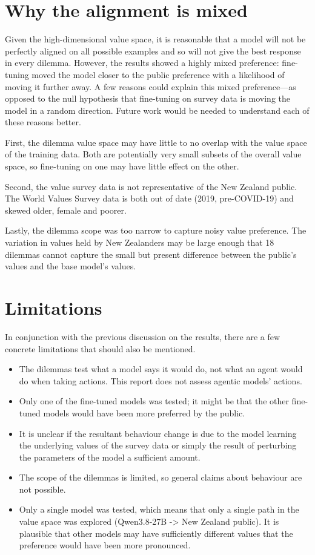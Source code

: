 \section{Why the alignment is mixed}

Given the high-dimensional value space, it is reasonable that a model will not be perfectly aligned on all possible examples and so will not give the best response in every dilemma. However, the results showed a highly mixed preference: fine-tuning moved the model closer to the public preference with a  likelihood of moving it further away. A few reasons could explain this mixed preference—as opposed to the null hypothesis that fine-tuning on survey data is moving the model in a random direction. Future work would be needed to understand each of these reasons better.

First, the dilemma value space may have little to no overlap with the value space of the training data. Both are potentially very small subsets of the overall value space, so fine-tuning on one may have little effect on the other.

Second, the value survey data is not representative of the New Zealand public. The World Values Survey data is both out of date (2019, pre-COVID-19) and skewed older, female and poorer.

Lastly, the dilemma scope was too narrow to capture noisy value preference. The variation in values held by New Zealanders may be large enough that 18 dilemmas cannot capture the small but present difference between the public's values and the base model's values.

\section{Limitations}

In conjunction with the previous discussion on the results, there are a few concrete limitations that should also be mentioned.

\begin{itemize}
    \item The dilemmas test what a model says it would do, not what an agent would do when taking actions. This report does not assess agentic models' actions.
    \item Only one of the fine-tuned models was tested; it might be that the other fine-tuned models would have been more preferred by the public.
    \item It is unclear if the resultant behaviour change is due to the model learning the underlying values of the survey data or simply the result of perturbing the parameters of the model a sufficient amount.
    \item The scope of the dilemmas is limited, so general claims about behaviour are not possible.
    \item Only a single model was tested, which means that only a single path in the value space was explored (Qwen3.8-27B -> New Zealand public). It is plausible that other models may have sufficiently different values that the preference would have been more pronounced.
\end{itemize}


